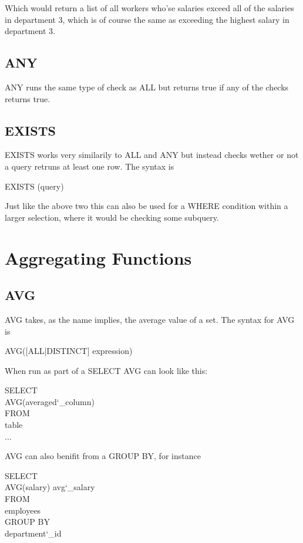 \documentclass[10pt, english]{article}
\begin{document}
Which would return a list of all workers who'se salaries exceed all of the salaries in department 3, which is of course
the same as exceeding the highest salary in department 3.

\subsection{ANY}
ANY runs the same type of check as ALL but returns true if any of the checks returns true.

\subsection{EXISTS}
EXISTS works very similarily to ALL and ANY but instead checks wether or not a query retruns at least one row. The syntax is 

\begin{texttt}EXISTS (query)\end{texttt}

Just like the above two this can also be used for a WHERE condition within a larger selection, where it would be checking some subquery.

\section{Aggregating Functions}
\subsection{AVG}
AVG takes, as the name implies, the average value of a set. The syntax for AVG is 

\begin{texttt}AVG([ALL|DISTINCT] expression)\end{texttt}

When run as part of a SELECT AVG can look like this:

\begin{texttt}
SELECT \\
\hspace*{10pt} AVG(averaged\char`_column) \\
FROM \\
\hspace*{10pt} table \\
...
\end{texttt}

AVG can also benifit from a GROUP BY, for instance

\begin{texttt}
SELECT \\
\hspace*{10pt} AVG(salary) avg\char`_salary \\
FROM \\
\hspace*{10pt} employees \\
GROUP BY \\
\hspace*{10pt} department\char`_id\\
\end{texttt}
\end{document}
